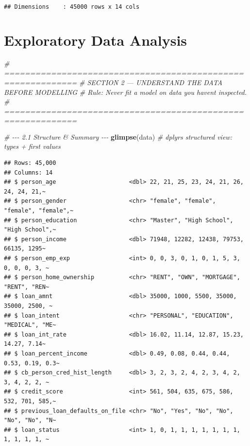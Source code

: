 \documentclass[
]{article}
\newenvironment{Shaded}{\begin{snugshade}}{\end{snugshade}}
\newcommand{\CommentTok}[1]{\textcolor[rgb]{0.56,0.35,0.01}{\textit{#1}}}
\newcommand{\FunctionTok}[1]{\textcolor[rgb]{0.13,0.29,0.53}{\textbf{#1}}}
\newcommand{\NormalTok}[1]{#1}
\begin{document}
\begin{verbatim}
## Dimensions    : 45000 rows x 14 cols
\end{verbatim}

\section{Exploratory Data Analysis}\label{exploratory-data-analysis}

\begin{Shaded}
\begin{Highlighting}[]
\CommentTok{\# ============================================================}
\CommentTok{\#  SECTION 2 — UNDERSTAND THE DATA BEFORE MODELLING}
\CommentTok{\#  Rule: Never fit a model on data you haven\textquotesingle{}t inspected.}
\CommentTok{\# ============================================================}

\CommentTok{\# {-}{-}{-} 2.1  Structure \& Summary {-}{-}{-}}
\FunctionTok{glimpse}\NormalTok{(data)               }\CommentTok{\# dplyr\textquotesingle{}s structured view: types + first values}
\end{Highlighting}
\end{Shaded}

\begin{verbatim}
## Rows: 45,000
## Columns: 14
## $ person_age                     <dbl> 22, 21, 25, 23, 24, 21, 26, 24, 24, 21,~
## $ person_gender                  <chr> "female", "female", "female", "female",~
## $ person_education               <chr> "Master", "High School", "High School",~
## $ person_income                  <dbl> 71948, 12282, 12438, 79753, 66135, 1295~
## $ person_emp_exp                 <int> 0, 0, 3, 0, 1, 0, 1, 5, 3, 0, 0, 0, 3, ~
## $ person_home_ownership          <chr> "RENT", "OWN", "MORTGAGE", "RENT", "REN~
## $ loan_amnt                      <dbl> 35000, 1000, 5500, 35000, 35000, 2500, ~
## $ loan_intent                    <chr> "PERSONAL", "EDUCATION", "MEDICAL", "ME~
## $ loan_int_rate                  <dbl> 16.02, 11.14, 12.87, 15.23, 14.27, 7.14~
## $ loan_percent_income            <dbl> 0.49, 0.08, 0.44, 0.44, 0.53, 0.19, 0.3~
## $ cb_person_cred_hist_length     <dbl> 3, 2, 3, 2, 4, 2, 3, 4, 2, 3, 4, 2, 2, ~
## $ credit_score                   <int> 561, 504, 635, 675, 586, 532, 701, 585,~
## $ previous_loan_defaults_on_file <chr> "No", "Yes", "No", "No", "No", "No", "N~
## $ loan_status                    <int> 1, 0, 1, 1, 1, 1, 1, 1, 1, 1, 1, 1, 1, ~
\end{verbatim}
\end{document}
